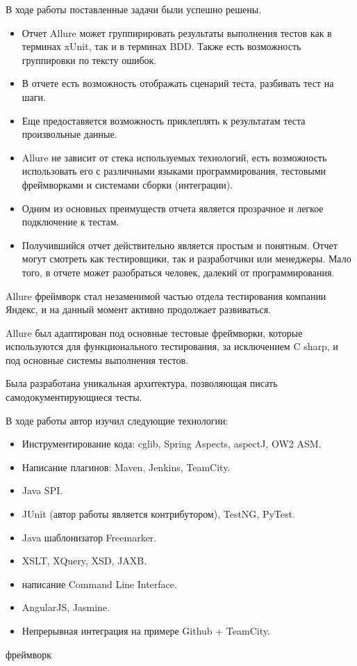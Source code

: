 \startconclusionpage

В ходе работы поставленные задачи были успешно решены.

\begin{itemize}
\item Отчет Allure может группирировать результаты выполнения тестов как в терминах xUnit, так и в терминах BDD. Также есть возможность группировки по тексту ошибок.
\item В отчете есть возможность отображать сценарий теста, разбивать тест на шаги.
\item Еще предоставяется возможность приклеплять к результатам теста произвольные данные.
\item Allure не зависит от стека используемых технологий, есть возможность использовать его с различными языками программирования, тестовыми фреймворками и системами сборки (интеграции). 
\item Одним из основных преимуществ отчета является прозрачное и легкое подключение к тестам.
\item Получившийся отчет действительно является простым и понятным. Отчет могут смотреть как тестировщики, так и разработчики или менеджеры. Мало того, в отчете может разобраться человек, далекий от программирования.
\end{itemize}

Allure фреймворк стал незаменимой частью отдела тестирования компании Яндекс, и на данный момент активно продолжает развиваться. 

Allure был адаптирован под основные тестовые фреймворки, которые используются для функционального тестирования, за исключением C sharp, и под основные системы выполнения тестов. 

Была разработана уникальная архитектура, позволяющая писать самодокументирующиеся тесты.

В ходе работы автор изучил следующие технологии:

\begin{itemize}
\item Инструментирование кода: cglib, Spring Aspects, aspectJ, OW2 ASM.
\item Написание плагинов: Maven, Jenkins, TeamCity.
\item Java SPI.
\item JUnit (автор работы является контрибутором), TestNG, PyTest.
\item Java шаблонизатор Freemarker.
\item XSLT, XQuery, XSD, JAXB.
\item написание Command Line Interface.
\item AngularJS, Jasmine.
\item Непрерывная интеграция на примере Github + TeamCity.
\end{itemize}

 
фреймворк